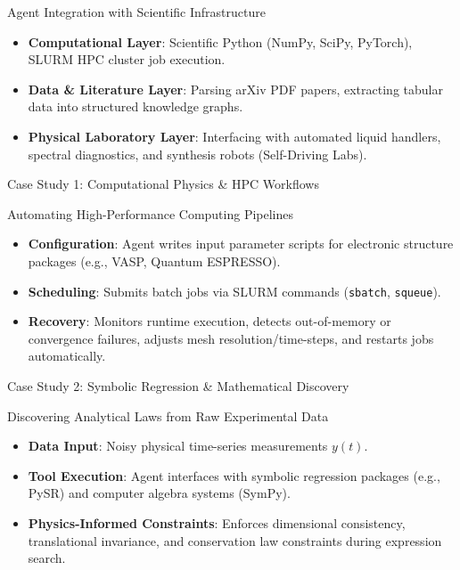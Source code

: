 \documentclass[10pt, aspectratio=169]{beamer}
\begin{document}
\begin{frame}{Agent Integration with Scientific Infrastructure}
  \begin{itemize}
    \item \textbf{Computational Layer}: Scientific Python (NumPy, SciPy, PyTorch), SLURM HPC cluster job execution.
    \item \textbf{Data \& Literature Layer}: Parsing arXiv PDF papers, extracting tabular data into structured knowledge graphs.
    \item \textbf{Physical Laboratory Layer}: Interfacing with automated liquid handlers, spectral diagnostics, and synthesis robots (Self-Driving Labs).
  \end{itemize}
\end{frame}

\begin{frame}{Case Study 1: Computational Physics \& HPC Workflows}
  \begin{block}{Automating High-Performance Computing Pipelines}
    \begin{itemize}
      \item \textbf{Configuration}: Agent writes input parameter scripts for electronic structure packages (e.g., VASP, Quantum ESPRESSO).
      \item \textbf{Scheduling}: Submits batch jobs via SLURM commands (\texttt{sbatch}, \texttt{squeue}).
      \item \textbf{Recovery}: Monitors runtime execution, detects out-of-memory or convergence failures, adjusts mesh resolution/time-steps, and restarts jobs automatically.
    \end{itemize}
  \end{block}
\end{frame}

\begin{frame}{Case Study 2: Symbolic Regression \& Mathematical Discovery}
  \begin{block}{Discovering Analytical Laws from Raw Experimental Data}
    \begin{itemize}
      \item \textbf{Data Input}: Noisy physical time-series measurements $y(t)$.
      \item \textbf{Tool Execution}: Agent interfaces with symbolic regression packages (e.g., PySR) and computer algebra systems (SymPy).
      \item \textbf{Physics-Informed Constraints}: Enforces dimensional consistency, translational invariance, and conservation law constraints during expression search.
    \end{itemize}
  \end{block}
\end{frame}
\end{document}
